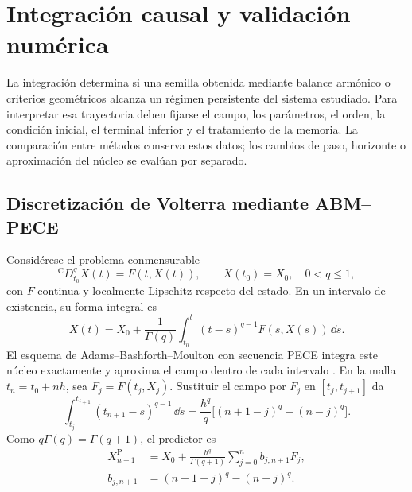 \section{Integración causal y validación numérica}
\label{bre:num:seccion}

La integración determina si una semilla obtenida mediante balance armónico o
criterios geométricos alcanza un régimen persistente del sistema estudiado.
Para interpretar esa trayectoria deben fijarse el campo, los parámetros, el
orden, la condición inicial, el terminal inferior y el tratamiento de la
memoria. La comparación entre métodos conserva estos datos; los cambios de
paso, horizonte o aproximación del núcleo se evalúan por separado.

\subsection{Discretización de Volterra mediante ABM--PECE}
\label{bre:num:pece}

Considérese el problema conmensurable
\begin{equation}
 {}^{\mathrm C}D_{t_0}^{q}X(t)=F(t,X(t)),\qquad X(t_0)=X_0,
 \quad 0<q\leq1,
 \label{bre:num:pvi}
\end{equation}
con $F$ continua y localmente Lipschitz respecto del estado. En un intervalo
de existencia, su forma integral es
\begin{equation}
 X(t)=X_0+\frac1{\Gamma(q)}
 \int_{t_0}^{t}(t-s)^{q-1}F(s,X(s))\,\dd s.
 \label{bre:num:volterra}
\end{equation}
El esquema de Adams--Bashforth--Moulton con secuencia PECE integra este núcleo
exactamente y aproxima el campo dentro de cada intervalo
\cite{DiethelmFordFreed2002}. En la malla $t_n=t_0+nh$, sea
$F_j=F(t_j,X_j)$. Sustituir el campo por $F_j$ en $[t_j,t_{j+1}]$ da
\[
 \int_{t_j}^{t_{j+1}}(t_{n+1}-s)^{q-1}\,\dd s
 =\frac{h^q}{q}\bigl[(n+1-j)^q-(n-j)^q\bigr].
\]
Como $q\Gamma(q)=\Gamma(q+1)$, el predictor es
\begin{align}
 X_{n+1}^{\mathrm P}
 &=X_0+\frac{h^q}{\Gamma(q+1)}\sum_{j=0}^{n}b_{j,n+1}F_j,
 \label{bre:num:predictor}\\
 b_{j,n+1}&=(n+1-j)^q-(n-j)^q.\nonumber
\end{align}

